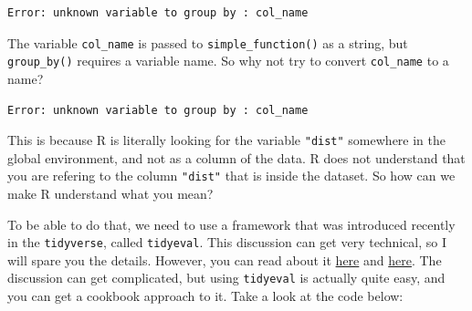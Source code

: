 \documentclass[]{gitbook}
\newenvironment{Shaded}{\begin{snugshade}}{\end{snugshade}}
\newcommand{\ControlFlowTok}[1]{\textcolor[rgb]{0.13,0.29,0.53}{\textbf{#1}}}
\newcommand{\DataTypeTok}[1]{\textcolor[rgb]{0.13,0.29,0.53}{#1}}
\newcommand{\KeywordTok}[1]{\textcolor[rgb]{0.13,0.29,0.53}{\textbf{#1}}}
\newcommand{\NormalTok}[1]{#1}
\newcommand{\OperatorTok}[1]{\textcolor[rgb]{0.81,0.36,0.00}{\textbf{#1}}}
\newcommand{\StringTok}[1]{\textcolor[rgb]{0.31,0.60,0.02}{#1}}
\theoremstyle{definition}
\theoremstyle{definition}
\theoremstyle{definition}
\theoremstyle{remark}
\begin{document}
\begin{verbatim}
Error: unknown variable to group by : col_name
\end{verbatim}

The variable \texttt{col\_name} is passed to \texttt{simple\_function()}
as a string, but \texttt{group\_by()} requires a variable name. So why
not try to convert \texttt{col\_name} to a name?

\begin{Shaded}
\end{Shaded}

\begin{verbatim}
Error: unknown variable to group by : col_name
\end{verbatim}

This is because R is literally looking for the variable \texttt{"dist"}
somewhere in the global environment, and not as a column of the data. R
does not understand that you are refering to the column \texttt{"dist"}
that is inside the dataset. So how can we make R understand what you
mean?

To be able to do that, we need to use a framework that was introduced
recently in the \texttt{tidyverse}, called \texttt{tidyeval}. This
discussion can get very technical, so I will spare you the details.
However, you can read about it
\href{http://dplyr.tidyverse.org/articles/programming.html}{here} and
\href{https://cran.r-project.org/web/packages/rlang/vignettes/tidy-evaluation.html}{here}.
The discussion can get complicated, but using \texttt{tidyeval} is
actually quite easy, and you can get a cookbook approach to it. Take a
look at the code below:

\begin{Shaded}
\end{Shaded}
\end{document}
